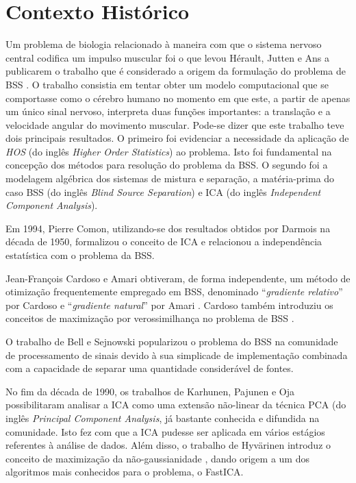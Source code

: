 \label{chap:2}

\section{Contexto Histórico}

    Um problema de biologia relacionado à maneira com que o sistema nervoso central codifica um impulso muscular foi o que levou Hérault, Jutten e Ans a publicarem o trabalho que é considerado a origem da formulação do problema de BSS \cite{french}. O trabalho consistia em tentar obter um modelo computacional que se comportasse como o cérebro humano no momento em que este, a partir de apenas um único sinal nervoso, interpreta duas funções importantes: a translação e a velocidade angular do movimento muscular. Pode-se dizer que este trabalho teve dois principais resultados. O primeiro foi evidenciar a necessidade da aplicação de \textit{HOS} (do inglês \textit{Higher Order Statistics}) ao problema. Isto foi fundamental na concepção dos métodos para resolução do problema da BSS. O segundo foi a modelagem algébrica dos sistemas de mistura e separação, a matéria-prima do caso BSS (do inglês \textit{Blind Source Separation}) e ICA (do inglês \textit{Independent Component Analysis}).


    Em 1994, Pierre Comon, utilizando-se dos resultados obtidos por Darmois na década de 1950, formalizou o conceito de ICA e relacionou a independência estatística com o problema da BSS. \cite{Comon}
    
    
    Jean-François Cardoso e Amari obtiveram, de forma independente, um método de otimização frequentemente empregado em BSS, denominado ``\textit{gradiente relativo}'' por Cardoso \cite{easi} e ``\textit{gradiente natural}'' por Amari \cite{Riemenn}. Cardoso também introduziu os conceitos de maximização por verossimilhança no problema de BSS \cite{ICA3}.
    
    
    O trabalho de Bell e Sejnowski \cite{ICAML} popularizou o problema do BSS na comunidade de processamento de sinais devido à sua simplicade de implementação combinada com a capacidade de separar uma quantidade considerável de fontes.
    
    No fim da década de 1990, os trabalhos de Karhunen, Pajunen e Oja \cite{ICA} possibilitaram analisar a ICA como uma extensão não-linear da técnica PCA (do inglês \textit{Principal Component Analysis}, já bastante conhecida e difundida na comunidade. Isto fez com que a ICA pudesse ser aplicada em vários estágios referentes à análise de dados. Além disso,  o trabalho de  Hyvärinen introduz o conceito de maximização da não-gaussianidade \cite{ICAML}, dando origem a um dos algoritmos mais conhecidos para o problema, o FastICA.
    

